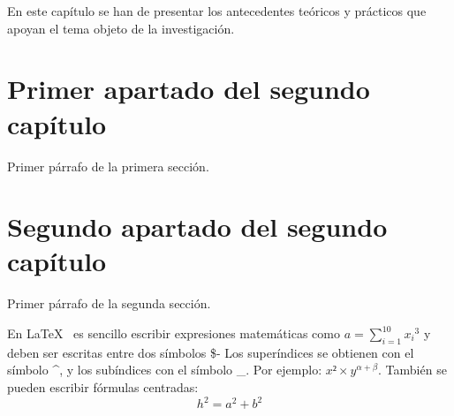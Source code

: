 

En este capítulo se han de presentar los antecedentes teóricos y prácticos que
apoyan el tema objeto de la investigación.


\section{Primer apartado del segundo capítulo}
\label{2:sec:1}
  Primer párrafo de la primera sección.

\section{Segundo apartado del segundo capítulo}
\label{2:sec:2}
  Primer párrafo de la segunda sección.

En \LaTeX{}~\cite{Lam:86} es sencillo escribir expresiones
matem\'aticas como $a=\sum_{i=1}^{10} {x_i}^{3}$
y deben ser escritas entre dos s\'imbolos \$-
Los super\'indices se obtienen con el s\'imbolo \^{}, y
los sub\'indices con el s\'imbolo \_.
Por ejemplo: $x² \times y^{\alpha + \beta}$.
Tambi\'en se pueden escribir f\'ormulas centradas:
\[h^2=a^2 + b^2 \]

